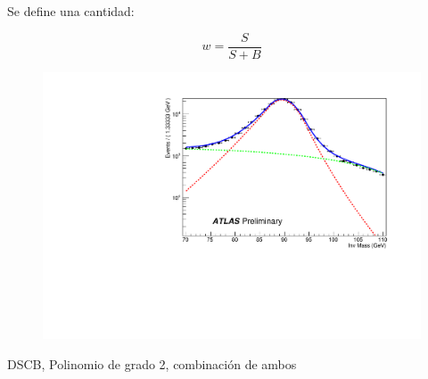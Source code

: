 \documentclass[10pt, compress,spanish]{beamer}
\begin{document}
\begin{frame}[fragile]
\begin{columns}
\begin{column}{0.5\textwidth}
Se define una cantidad:

\begin{equation*}
w=\frac{S}{S+B}
\end{equation*}

\begin{figure}
\includegraphics[scale=0.30]{d15_16_egam1_m_lmet_fit_h_m_eg_EE.pdf} 
\end{figure}

{\small {\red DSCB,} {\green Polinomio de grado 2, }{ \blue combinación de ambos}}

\end{column}

\end{columns}


\end{frame}


\end{document}
